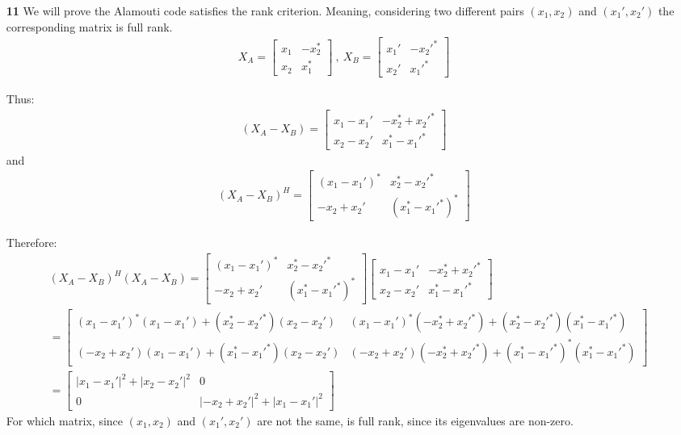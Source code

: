 \documentclass[12pt]{article}
\begin{document}
\begin{enumerate}
\begin{enumerate}
			\newpage
			\item[\bf 11]
			We will prove the Alamouti code satisfies the rank criterion. Meaning, considering two different pairs $(x_1,x_2)$ and $(x_1',x_2')$ the corresponding matrix is full rank.
			\begin{align*}
				X_A = \begin{bmatrix}
					x_1 &-x_2^* \\ x_2 & x_1^*
				\end{bmatrix}
			\ ,\ 
			X_B = \begin{bmatrix}
				x_1' &-x_2'^* \\ x_2' & x_1'^*
			\end{bmatrix}
			\end{align*}
		
			Thus:\begin{align*}
				(X_A-X_B)=\begin{bmatrix}
					x_1-x_1' & -x_2^*+x_2'^* \\ x_2-x_2' & x_1^*-x_1'^*
				\end{bmatrix}
			\end{align*}
			and
			\begin{align*}
				(X_A-X_B)^H=\begin{bmatrix}
					(x_1-x_1')^* & x_2^*-x_2'^* \\ -x_2+x_2' & (x_1^*-x_1'^*)^*
				\end{bmatrix}
			\end{align*}
			
			Therefore:
			\begin{align*}
				&(X_A-X_B)^H(X_A-X_B)=\begin{bmatrix}
					(x_1-x_1')^* & x_2^*-x_2'^* \\ -x_2+x_2' & (x_1^*-x_1'^*)^*
				\end{bmatrix}
				\begin{bmatrix}
					x_1-x_1' & -x_2^*+x_2'^* \\ x_2-x_2' & x_1^*-x_1'^*
				\end{bmatrix}\\
				&=\begin{bmatrix}
					(x_1-x_1')^*(x_1-x_1') + (x_2^*-x_2'^*)(x_2-x_2') & (x_1-x_1')^*(-x_2^*+x_2'^*)+(x_2^*-x_2'^*)( x_1^*-x_1'^*) \\ 
					 (-x_2+x_2')(x_1-x_1')+(x_1^*-x_1'^*)(x_2-x_2') & (-x_2+x_2')(-x_2^*+x_2'^*)+(x_1^*-x_1'^*)^*(x_1^*-x_1'^*)
				\end{bmatrix}\\
				&=\begin{bmatrix}
					|x_1-x_1'|^2 + |x_2-x_2'|^2 & 0 \\
					0 & |-x_2+x_2'|^2 + |x_1-x_1'|^2
				\end{bmatrix}
			\end{align*}
			For which matrix, since $(x_1,x_2)$ and $(x_1',x_2')$ are not the same, is full rank, since its eigenvalues are non-zero.
		\end{enumerate}
		

\end{enumerate}
\end{document}
